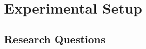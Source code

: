\documentclass[conference]{IEEEtran}
\newcommand{\result}[1]{%
\begin{tcolorbox}[colframe=black,boxrule=0.5pt,arc=4pt,
      left=6pt,right=6pt,top=6pt,bottom=6pt,boxsep=0pt,width=\columnwidth]%
      {\emph{#1}}
\end{tcolorbox}%
}
\begin{document}
% 
% 
% 



\section{Experimental Setup} \label{sec:setup}

\subsection{Research Questions}
\end{document}
